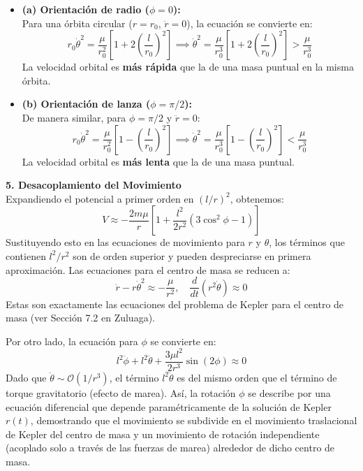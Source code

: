 \documentclass[a4paper]{article}
\begin{document}
\begin{itemize}
    \item \textbf{(a) Orientación de radio ($\phi = 0$):} \\
    Para una órbita circular ($r=r_0$, $\ddot{r}=0$), la ecuación se convierte en:
    $$
    r_0\dot{\theta}^2 = \frac{\mu}{r_0^2} \left[ 1 + 2\left(\frac{l}{r_0}\right)^2 \right] \implies \dot{\theta}^2 = \frac{\mu}{r_0^3} \left[ 1 + 2\left(\frac{l}{r_0}\right)^2 \right] > \frac{\mu}{r_0^3}
    $$
    La velocidad orbital es \textbf{más rápida} que la de una masa puntual en la misma órbita.

    \item \textbf{(b) Orientación de lanza ($\phi = \pi/2$):} \\
    De manera similar, para $\phi = \pi/2$ y $\ddot{r}=0$:
    $$
    r_0\dot{\theta}^2 = \frac{\mu}{r_0^2} \left[ 1 - \left(\frac{l}{r_0}\right)^2 \right] \implies \dot{\theta}^2 = \frac{\mu}{r_0^3} \left[ 1 - \left(\frac{l}{r_0}\right)^2 \right] < \frac{\mu}{r_0^3}
    $$
    La velocidad orbital es \textbf{más lenta} que la de una masa puntual.
\end{itemize}

\textbf{5. Desacoplamiento del Movimiento} \\
Expandiendo el potencial a primer orden en $(l/r)^2$, obtenemos:
$$
V \approx -\frac{2m\mu}{r} \left[ 1 + \frac{l^2}{2r^2}(3\cos^2\phi - 1) \right]
$$
Sustituyendo esto en las ecuaciones de movimiento para $r$ y $\theta$, los términos que contienen $l^2/r^2$ son de orden superior y pueden despreciarse en primera aproximación. Las ecuaciones para el centro de masa se reducen a:
$$
\ddot{r} - r\dot{\theta}^2 \approx -\frac{\mu}{r^2}, \quad \frac{d}{dt}(r^2\dot{\theta}) \approx 0
$$
Estas son exactamente las ecuaciones del problema de Kepler para el centro de masa (ver Sección 7.2 en Zuluaga). 

Por otro lado, la ecuación para $\phi$ se convierte en:
$$
l^2\ddot{\phi} + l^2\ddot{\theta} + \frac{3\mu l^2}{2r^3} \sin(2\phi) \approx 0
$$
Dado que $\ddot{\theta} \sim \mathcal{O}(1/r^3)$, el término $l^2\ddot{\theta}$ es del mismo orden que el término de torque gravitatorio (efecto de marea). Así, la rotación $\phi$ se describe por una ecuación diferencial que depende paramétricamente de la solución de Kepler $r(t)$, demostrando que el movimiento se subdivide en el movimiento traslacional de Kepler del centro de masa y un movimiento de rotación independiente (acoplado solo a través de las fuerzas de marea) alrededor de dicho centro de masa.
\end{document}
